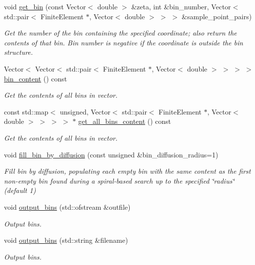 \begin{DoxyCompactItemize}
void \hyperlink{classNonRefineableBinArray_a9482f2913608b1ce36c75acacdaf99e7}{get\+\_\+bin} (const Vector$<$ double $>$ \&zeta, int \&bin\+\_\+number, Vector$<$ std\+::pair$<$ Finite\+Element $\ast$, Vector$<$ double $>$ $>$ $>$ \&sample\+\_\+point\+\_\+pairs)
\begin{DoxyCompactList}\small\item\em Get the number of the bin containing the specified coordinate; also return the contents of that bin. Bin number is negative if the coordinate is outside the bin structure. \end{DoxyCompactList}\item 
Vector$<$ Vector$<$ std\+::pair$<$ Finite\+Element $\ast$, Vector$<$ double $>$ $>$ $>$ $>$ \hyperlink{classNonRefineableBinArray_ab5f0fb40c4211e20cfe927d6eb1206f9}{bin\+\_\+content} () const
\begin{DoxyCompactList}\small\item\em Get the contents of all bins in vector. \end{DoxyCompactList}\item 
const std\+::map$<$ unsigned, Vector$<$ std\+::pair$<$ Finite\+Element $\ast$, Vector$<$ double $>$ $>$ $>$ $>$ $\ast$ \hyperlink{classNonRefineableBinArray_a0ee4ab7c5c1f27271ac1666656b15ad6}{get\+\_\+all\+\_\+bins\+\_\+content} () const
\begin{DoxyCompactList}\small\item\em Get the contents of all bins in vector. \end{DoxyCompactList}\item 
void \hyperlink{classNonRefineableBinArray_a78f35a6feaf2c540998ec059639a8bf4}{fill\+\_\+bin\+\_\+by\+\_\+diffusion} (const unsigned \&bin\+\_\+diffusion\+\_\+radius=1)
\begin{DoxyCompactList}\small\item\em Fill bin by diffusion, populating each empty bin with the same content as the first non-\/empty bin found during a spiral-\/based search up to the specified \char`\"{}radius\char`\"{} (default 1) \end{DoxyCompactList}\item 
void \hyperlink{classNonRefineableBinArray_aace5835e23625cc491a2fe084823ac3a}{output\+\_\+bins} (std\+::ofstream \&outfile)
\begin{DoxyCompactList}\small\item\em Output bins. \end{DoxyCompactList}\item 
void \hyperlink{classNonRefineableBinArray_a8e19ec2e3229a8e533ed7b4040a244f6}{output\+\_\+bins} (std\+::string \&filename)
\begin{DoxyCompactList}\small\item\em Output bins. \end{DoxyCompactList}\end{DoxyCompactItemize}
